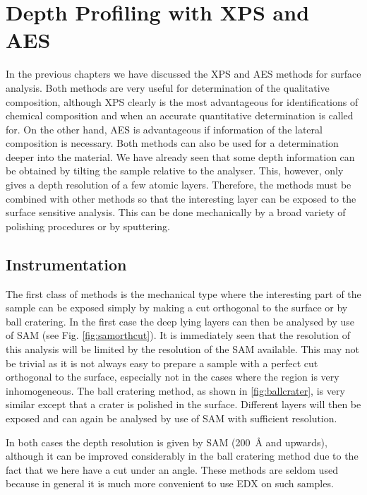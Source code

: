 \chapter{Depth Profiling with XPS and AES}
In the previous chapters we have discussed the XPS and AES methods for surface analysis. Both methods are very useful for determination of the qualitative composition, although XPS clearly is the most advantageous for identifications of chemical composition and when an accurate quantitative determination is called for. On the other hand, AES is advantageous if information of the lateral composition is necessary. Both methods can also be used for a determination deeper into the material. We have already seen that some depth information can be obtained by tilting the sample relative to the analyser. This, however, only gives a depth resolution of a few atomic layers. Therefore, the methods must be combined with other methods so that the interesting layer can be exposed to the surface sensitive analysis. This can be done mechanically by a broad variety of polishing procedures or by sputtering.

\section{Instrumentation}
The first class of methods is the mechanical type where the interesting part of the sample can be exposed simply by making a cut orthogonal to the surface or by ball cratering. In the first case the deep lying layers can then be analysed by use of SAM (see Fig. \ref{fig:samorthcut}). It is immediately seen that the resolution of this analysis will be limited by the resolution of the SAM available. This may not be trivial as it is not always easy to prepare a sample with a perfect cut orthogonal to the surface, especially not in the cases where the region is very inhomogeneous. The ball cratering method, as shown in \autoref{fig:ballcrater}, is very similar except that a crater is polished in the surface. Different layers will then be exposed and can again be analysed by use of SAM with sufficient resolution.

In both cases the depth resolution is given by SAM (\SI{200}{\angstrom} and upwards), although it can be improved considerably in the ball cratering method due to the fact that we here have a cut under an angle. These methods are seldom used because in general it is much more convenient to use EDX on such samples.

